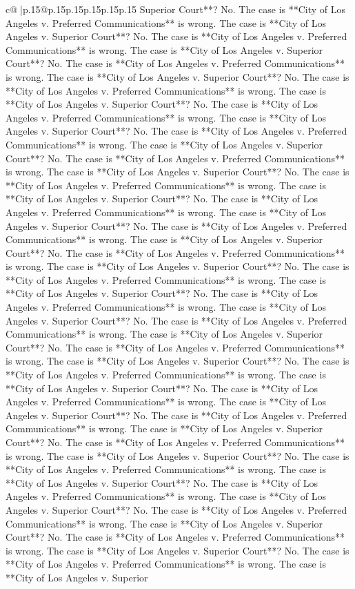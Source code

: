 \documentclass{article}
\begin{document}
{\begin{supertabular}{c@{$\;$}|p{.15\linewidth}@{}p{.15\linewidth}p{.15\linewidth}p{.15\linewidth}p{.15\linewidth}p{.15\linewidth}}
{{{Superior Court**? No. The case is **City of Los Angeles v. Preferred Communications** is wrong. The case is **City of Los Angeles v. Superior Court**? No. The case is **City of Los Angeles v. Preferred Communications** is wrong. The case is **City of Los Angeles v. Superior Court**? No. The case is **City of Los Angeles v. Preferred Communications** is wrong. The case is **City of Los Angeles v. Superior Court**? No. The case is **City of Los Angeles v. Preferred Communications** is wrong. The case is **City of Los Angeles v. Superior Court**? No. The case is **City of Los Angeles v. Preferred Communications** is wrong. The case is **City of Los Angeles v. Superior Court**? No. The case is **City of Los Angeles v. Preferred Communications** is wrong. The case is **City of Los Angeles v. Superior Court**? No. The case is **City of Los Angeles v. Preferred Communications** is wrong. The case is **City of Los Angeles v. Superior Court**? No. The case is **City of Los Angeles v. Preferred Communications** is wrong. The case is **City of Los Angeles v. Superior Court**? No. The case is **City of Los Angeles v. Preferred Communications** is wrong. The case is **City of Los Angeles v. Superior Court**? No. The case is **City of Los Angeles v. Preferred Communications** is wrong. The case is **City of Los Angeles v. Superior Court**? No. The case is **City of Los Angeles v. Preferred Communications** is wrong. The case is **City of Los Angeles v. Superior Court**? No. The case is **City of Los Angeles v. Preferred Communications** is wrong. The case is **City of Los Angeles v. Superior Court**? No. The case is **City of Los Angeles v. Preferred Communications** is wrong. The case is **City of Los Angeles v. Superior Court**? No. The case is **City of Los Angeles v. Preferred Communications** is wrong. The case is **City of Los Angeles v. Superior Court**? No. The case is **City of Los Angeles v. Preferred Communications** is wrong. The case is **City of Los Angeles v. Superior Court**? No. The case is **City of Los Angeles v. Preferred Communications** is wrong. The case is **City of Los Angeles v. Superior Court**? No. The case is **City of Los Angeles v. Preferred Communications** is wrong. The case is **City of Los Angeles v. Superior Court**? No. The case is **City of Los Angeles v. Preferred Communications** is wrong. The case is **City of Los Angeles v. Superior Court**? No. The case is **City of Los Angeles v. Preferred Communications** is wrong. The case is **City of Los Angeles v. Superior Court**? No. The case is **City of Los Angeles v. Preferred Communications** is wrong. The case is **City of Los Angeles v. Superior Court**? No. The case is **City of Los Angeles v. Preferred Communications** is wrong. The case is **City of Los Angeles v. Superior Court**? No. The case is **City of Los Angeles v. Preferred Communications** is wrong. The case is **City of Los Angeles v. Superior Court**? No. The case is **City of Los Angeles v. Preferred Communications** is wrong. The case is **City of Los Angeles v. Superior Court**? No. The case is **City of Los Angeles v. Preferred Communications** is wrong. The case is **City of Los Angeles v. Superior }}}
\end{supertabular}}
\end{document}
